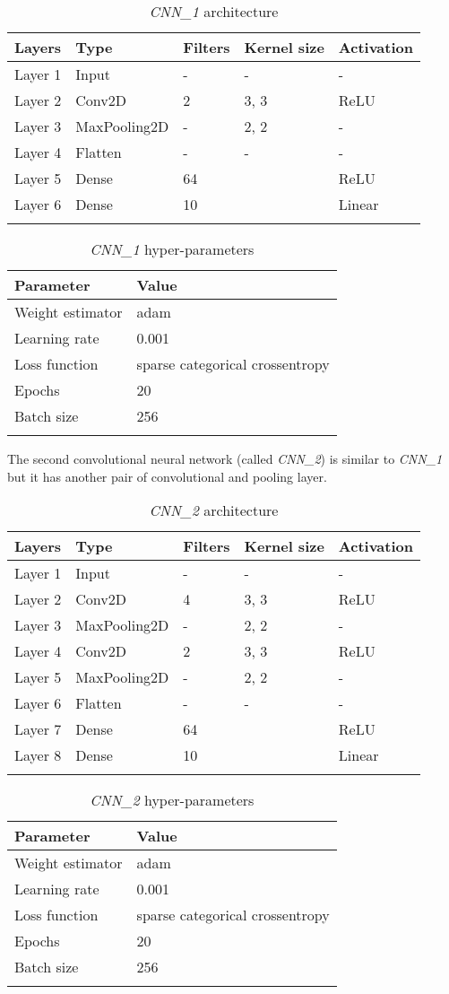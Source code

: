 \begin{longtable}[]{@{}lllll@{}}
	\toprule
	\textbf{Layers} & \textbf{Type} & \textbf{Filters} & \textbf{Kernel size} &
	\textbf{Activation}\tabularnewline
	\midrule
	\endhead
	Layer 1 & Input & - & - & -\tabularnewline
	Layer 2 & Conv2D & 2 & 3, 3 & ReLU\tabularnewline
	Layer 3 & MaxPooling2D & - & 2, 2 & -\tabularnewline
	Layer 4 & Flatten & - & - & -\tabularnewline
	Layer 5 & Dense & 64 & & ReLU\tabularnewline
	Layer 6 & Dense & 10 & & Linear\tabularnewline
	\bottomrule
		\caption{\emph{CNN\_1} architecture}
\end{longtable}

\begin{longtable}[]{@{}ll@{}}
	\toprule
	\textbf{Parameter} & \textbf{Value}\tabularnewline
	\midrule
	\endhead
	Weight estimator & adam\tabularnewline
	Learning rate & 0.001\tabularnewline
	Loss function & sparse categorical crossentropy\tabularnewline
	Epochs & 20\tabularnewline
	Batch size & 256\tabularnewline
	\bottomrule
	\caption{\emph{CNN\_1} hyper-parameters}
\end{longtable}

The second convolutional neural network (called \emph{CNN\_2}) is
similar to \emph{CNN\_1} but it has another pair of convolutional and
pooling layer.

\begin{longtable}[]{@{}lllll@{}}
	\toprule
	\textbf{Layers} & Type & \textbf{Filters} & \textbf{Kernel size} &
	\textbf{Activation}\tabularnewline
	\midrule
	\endhead
	Layer 1 & Input & - & - & -\tabularnewline
	Layer 2 & Conv2D & 4 & 3, 3 & ReLU\tabularnewline
	Layer 3 & MaxPooling2D & - & 2, 2 & -\tabularnewline
	Layer 4 & Conv2D & 2 & 3, 3 & ReLU\tabularnewline
	Layer 5 & MaxPooling2D & - & 2, 2 & -\tabularnewline
	Layer 6 & Flatten & - & - & -\tabularnewline
	Layer 7 & Dense & 64 & & ReLU\tabularnewline
	Layer 8 & Dense & 10 & & Linear\tabularnewline
	\bottomrule
		\caption{\emph{CNN\_2} architecture}
\end{longtable}

\newpage

\begin{longtable}[]{@{}ll@{}}
	\toprule
	\textbf{Parameter} & \textbf{Value}\tabularnewline
	\midrule
	\endhead
	Weight estimator & adam\tabularnewline
	Learning rate & 0.001\tabularnewline
	Loss function & sparse categorical crossentropy\tabularnewline
	Epochs & 20\tabularnewline
	Batch size & 256\tabularnewline
	\bottomrule
		\caption{\emph{CNN\_2} hyper-parameters}
\end{longtable}

